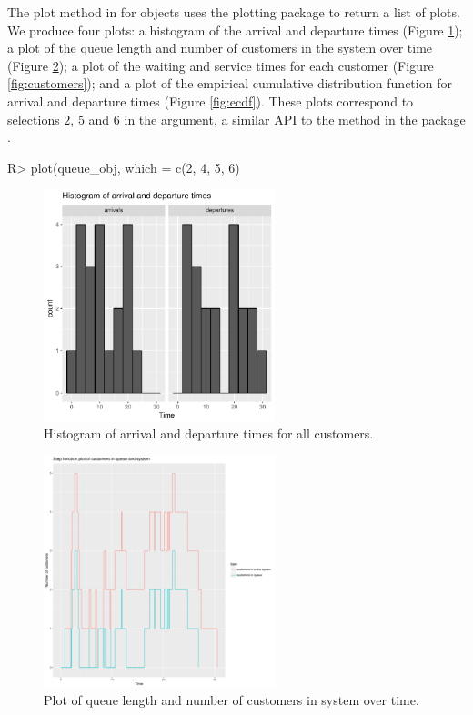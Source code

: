 \documentclass[article]{jss}
\begin{document}
The plot method in  for  objects uses the plotting package  \citep{Rpkg_ggplot2} to return a list of plots. We produce four plots: a histogram of the arrival and departure times (Figure \ref{fig:histogram}); a plot of the queue length and number of customers in the system over time (Figure \ref{fig:qlength}); a plot of the waiting and service times for each customer (Figure \ref{fig:customers}); and a plot of the empirical cumulative distribution function for arrival and departure times (Figure \ref{fig:ecdf}). These plots correspond to selections $2$, $5$ and $6$ in the  argument, a similar API to the  method in the  package \citep{Rproglang}.

\begin{CodeChunk}
\begin{CodeInput}
R> plot(queue_obj, which = c(2, 4, 5, 6)
\end{CodeInput}
\end{CodeChunk}

\begin{figure}[!htb]
\centering
\includegraphics[width = 0.6\textwidth]{figures/hist_081.pdf}
\caption{Histogram of arrival and departure times for all customers.}
\label{fig:histogram}
\end{figure}

\begin{figure}[!htb]
\centering
\includegraphics[width = 0.6\textwidth]{figures/qlength_081.pdf}
\caption{Plot of queue length and number of customers in system over time.}
\label{fig:qlength}
\end{figure}
\end{document}
